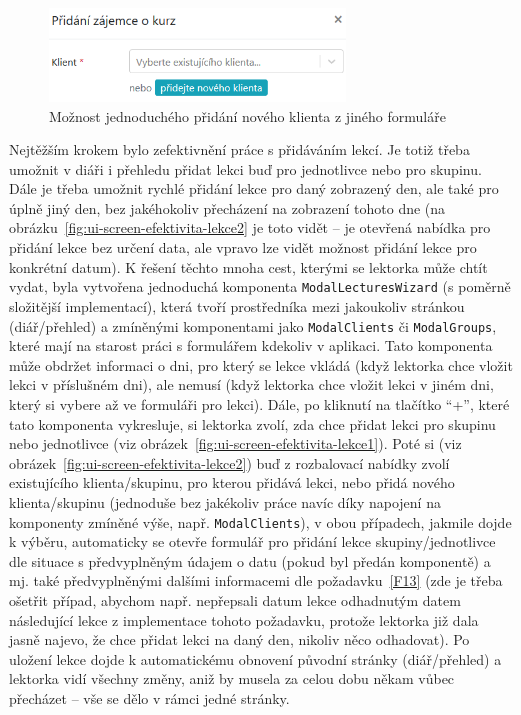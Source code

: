 \begin{figure}[h]\centering
    \includegraphics[width=0.7\textwidth]{img/ui-screen-efektivita-zajemci.png}
    \caption{Možnost jednoduchého přidání nového klienta z jiného formuláře}\label{fig:ui-screen-efektivita-zajemci}
\end{figure}

Nejtěžším krokem bylo zefektivnění práce s přidáváním lekcí. Je totiž třeba umožnit v diáři i přehledu přidat lekci buď pro jednotlivce nebo pro skupinu. Dále je třeba umožnit rychlé přidání lekce pro daný zobrazený den, ale také pro úplně jiný den, bez jakéhokoliv přecházení na zobrazení tohoto dne (na obrázku~\ref{fig:ui-screen-efektivita-lekce2} je toto vidět -- je otevřená nabídka pro přidání lekce bez určení data, ale vpravo lze vidět možnost přidání lekce pro konkrétní datum). K řešení těchto mnoha cest, kterými se lektorka může chtít vydat, byla vytvořena jednoduchá komponenta \verb|ModalLecturesWizard| (s poměrně složitější implementací), která tvoří prostředníka mezi jakoukoliv stránkou (diář/přehled) a zmíněnými komponentami jako \verb|ModalClients| či \verb|ModalGroups|, které mají na starost práci s formulářem kdekoliv v aplikaci. Tato komponenta může obdržet informaci o dni, pro který se lekce vkládá (když lektorka chce vložit lekci v příslušném dni), ale nemusí (když lektorka chce vložit lekci v jiném dni, který si vybere až ve formuláři pro lekci). Dále, po kliknutí na tlačítko \enquote{+}, které tato komponenta vykresluje, si lektorka zvolí, zda chce přidat lekci pro skupinu nebo jednotlivce (viz obrázek~\ref{fig:ui-screen-efektivita-lekce1}). Poté si (viz obrázek~\ref{fig:ui-screen-efektivita-lekce2}) buď z rozbalovací nabídky zvolí existujícího klienta/skupinu, pro kterou přidává lekci, nebo přidá nového klienta/skupinu (jednoduše bez jakékoliv práce navíc díky napojení na komponenty zmíněné výše, např. \verb|ModalClients|), v obou případech, jakmile dojde k výběru, automaticky se otevře formulář pro přidání lekce skupiny/jednotlivce dle situace s předvyplněným údajem o datu (pokud byl předán komponentě) a mj. také předvyplněnými dalšími informacemi dle požadavku~\ref{F13} (zde je třeba ošetřit případ, abychom např. nepřepsali datum lekce odhadnutým datem následující lekce z implementace tohoto požadavku, protože lektorka již dala jasně najevo, že chce přidat lekci na daný den, nikoliv něco odhadovat). Po uložení lekce dojde k automatickému obnovení původní stránky (diář/přehled) a lektorka vidí všechny změny, aniž by musela za celou dobu někam vůbec přecházet -- vše se dělo v rámci jedné stránky.

